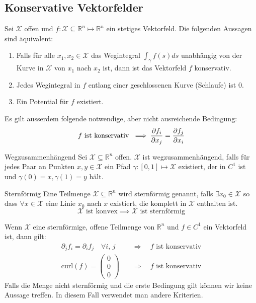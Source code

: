 \documentclass[a4paper,10pt]{article}
\def\R{\mathbb{R}}
\def\X{\mathcal{X}}
\begin{document}
\subsection{Konservative Vektorfelder}
Sei \(\X\) offen und \(f: \X \subseteq \R^n \mapsto \R^n\) ein stetiges Vektorfeld. Die folgenden Aussagen sind äquivalent:
\begin{enumerate}
  \item Falls für alle \(x_1, x_2 \in \X\) das Wegintegral \(\int_\gamma f(s) ds\) unabhängig von der Kurve in \(\X\) von \(x_1\) nach \(x_2\) ist, dann ist das Vektorfeld \(f\) konservativ.
  \item Jedes Wegintegral in \(f\) entlang einer geschlossenen Kurve (Schlaufe) ist 0.
  \item Ein Potential für \(f\) existiert.
\end{enumerate}
Es gilt ausserdem folgende notwendige, aber nicht ausreichende Bedingung:
\[f \text{ ist konservativ }\implies \pdv{f_i}{x_j} = \pdv{f_j}{x_i}\]

\begin{subbox}{Wegzusammenhängend}
  Sei \(\X \subseteq \R^n\) offen. \(\X\) ist wegzusammenhängend, falls für jedes Paar an Punkten \(x, y \in \X\) ein Pfad \(\gamma : \left[0,1\right] \mapsto \X\) existiert, der in \(C^1\) ist und \(\gamma(0) = x, \gamma(1) = y\) hält.
\end{subbox}

\begin{subbox}{Sternförmig}
  Eine Teilmenge \(\X \subseteq \R^n\) wird sternförmig genannt, falls \(\exists x_0 \in \X\) so dass \(\forall x \in \X\) eine Linie \(x_0\) nach \(x\) existiert, die komplett in \(\X\) enthalten ist. 
  \[\X \text{ ist konvex} \implies \X \text{ ist sternförmig}\]
\end{subbox}
Wenn \(\X\) eine sternförmige, offene Teilmenge von \(\R^n\) und \(f \in C^1\) ein Vektorfeld ist, dann gilt:
\begin{align*}
  \partial_j f_i = \partial_i f_j \quad \forall i,\, j
  \quad &\Rightarrow \quad \text{$f$ ist konservativ}\\
  \text{curl}(f) = \begin{pmatrix}
    0\\0\\0
  \end{pmatrix}
  \quad &\Rightarrow \quad \text{$f$ ist konservativ}
\end{align*}
Falls die Menge nicht sternförmig und die erste Bedingung gilt können wir keine Aussage treffen. In diesem Fall verwendet man andere Kriterien.
\end{document}
